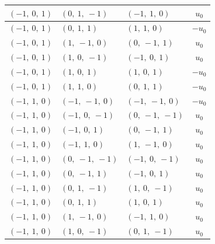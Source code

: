 \documentclass[11pt]{article}
\theoremstyle{definition}
\begin{document}
\begin{longtable}{|l|l|l|c|}
    \hline
    $\left( -1, \  0, \  1\right)$ & $\left( 0, \  1, \  -1\right)$ & $\left( -1, \  1, \  0\right)$ & $u_{0}$ \\
    \hline
    $\left( -1, \  0, \  1\right)$ & $\left( 0, \  1, \  1\right)$ & $\left( 1, \  1, \  0\right)$ & $- u_{0}$ \\
    \hline
    $\left( -1, \  0, \  1\right)$ & $\left( 1, \  -1, \  0\right)$ & $\left( 0, \  -1, \  1\right)$ & $u_{0}$ \\
    \hline
    $\left( -1, \  0, \  1\right)$ & $\left( 1, \  0, \  -1\right)$ & $\left( -1, \  0, \  1\right)$ & $u_{0}$ \\
    \hline
    $\left( -1, \  0, \  1\right)$ & $\left( 1, \  0, \  1\right)$ & $\left( 1, \  0, \  1\right)$ & $- u_{0}$ \\
    \hline
    $\left( -1, \  0, \  1\right)$ & $\left( 1, \  1, \  0\right)$ & $\left( 0, \  1, \  1\right)$ & $- u_{0}$ \\
    \hline
    $\left( -1, \  1, \  0\right)$ & $\left( -1, \  -1, \  0\right)$ & $\left( -1, \  -1, \  0\right)$ & $- u_{0}$ \\
    \hline
    $\left( -1, \  1, \  0\right)$ & $\left( -1, \  0, \  -1\right)$ & $\left( 0, \  -1, \  -1\right)$ & $u_{0}$ \\
    \hline
    $\left( -1, \  1, \  0\right)$ & $\left( -1, \  0, \  1\right)$ & $\left( 0, \  -1, \  1\right)$ & $u_{0}$ \\
    \hline
    $\left( -1, \  1, \  0\right)$ & $\left( -1, \  1, \  0\right)$ & $\left( 1, \  -1, \  0\right)$ & $u_{0}$ \\
    \hline
    $\left( -1, \  1, \  0\right)$ & $\left( 0, \  -1, \  -1\right)$ & $\left( -1, \  0, \  -1\right)$ & $u_{0}$ \\
    \hline
    $\left( -1, \  1, \  0\right)$ & $\left( 0, \  -1, \  1\right)$ & $\left( -1, \  0, \  1\right)$ & $u_{0}$ \\
    \hline
    $\left( -1, \  1, \  0\right)$ & $\left( 0, \  1, \  -1\right)$ & $\left( 1, \  0, \  -1\right)$ & $u_{0}$ \\
    \hline
    $\left( -1, \  1, \  0\right)$ & $\left( 0, \  1, \  1\right)$ & $\left( 1, \  0, \  1\right)$ & $u_{0}$ \\
    \hline
    $\left( -1, \  1, \  0\right)$ & $\left( 1, \  -1, \  0\right)$ & $\left( -1, \  1, \  0\right)$ & $u_{0}$ \\
    \hline
    $\left( -1, \  1, \  0\right)$ & $\left( 1, \  0, \  -1\right)$ & $\left( 0, \  1, \  -1\right)$ & $u_{0}$ \\

\end{longtable}
\end{document}
